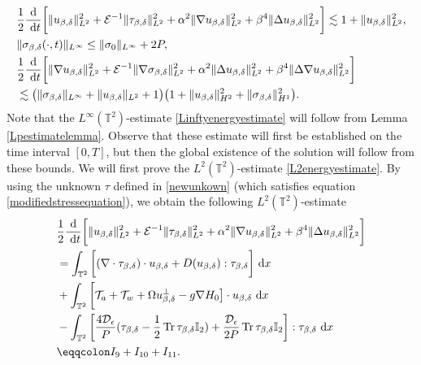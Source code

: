 \documentclass[12pt,a4paper]{article}
\theoremstyle{definition}
\theoremstyle{remark}
\numberwithin{equation}{section}
\newcommand{\dx}{\ {\rm d} {x}}
\newcommand{\dt}{\ {\rm d} t }
\DeclareMathOperator{\Tr}{Tr}
\begin{document}
\begin{align}
&\frac{1}{2} \frac{\textrm{d}}{\dt} \bigg[ \lVert u_{\beta,\delta} \rVert_{L^2}^2 + \mathcal{E}^{-1} \lVert \tau_{\beta,\delta} \rVert_{L^2}^2 + \alpha^2 \lVert \nabla u_{\beta,\delta} \rVert_{L^2}^2 + \beta^4 \lVert \Delta u_{\beta,\delta} \rVert_{L^2}^2 \bigg] \lesssim 1 + \lVert u_{\beta,\delta} \rVert_{L^2}^2, \label{L2energyestimate} \\
&\lVert \sigma_{\beta,\delta} (\cdot, t) \rVert_{L^\infty} \leq \lVert \sigma_0 \rVert_{L^\infty} + 2 P, \label{Linftyenergyestimate} \\
&\frac{1}{2} \frac{\textrm{d}}{\dt} \bigg[ \lVert \nabla u_{\beta,\delta} \rVert_{L^2}^2 + \mathcal{E}^{-1} \lVert \nabla \sigma_{\beta,\delta} \rVert_{L^2}^2 + \alpha^2 \lVert \Delta u_{\beta,\delta} \rVert_{L^2}^2 + \beta^4 \lVert \Delta \nabla u_{\beta,\delta} \rVert_{L^2}^2 \bigg] \nonumber \\
&\lesssim \big(\lVert \sigma_{\beta,\delta} \rVert_{L^\infty} + \lVert u_{\beta,\delta} \rVert_{L^2} + 1\big) \big(1 + \lVert u_{\beta,\delta} \rVert_{H^2}^2 + \lVert \sigma_{\beta,\delta} \rVert_{H^1}^2 \big). \label{H1energyestimate}
\end{align}
Note that the $L^\infty (\mathbb{T}^2)$-estimate \eqref{Linftyenergyestimate} will follow from Lemma \ref{Lpestimatelemma}. Observe that these estimate will first be established on the time interval $[0,T]$, but then the global existence of the solution will follow from these bounds. We will first prove the $L^2 (\mathbb{T}^2)$-estimate \eqref{L2energyestimate}. By using the unknown $\tau$ defined in \eqref{newunkown} (which satisfies equation \eqref{modifiedstressequation}), we obtain the following $L^2 (\mathbb{T}^2)$-estimate
\begin{align*}
&\frac{1}{2} \frac{\textrm{d}}{\dt} \bigg[ \lVert u_{\beta,\delta} \rVert_{L^2}^2 + \mathcal{E}^{-1} \lVert \tau_{\beta,\delta} \rVert_{L^2}^2 + \alpha^2 \lVert \nabla u_{\beta,\delta} \rVert_{L^2}^2 + \beta^4 \lVert \Delta u_{\beta,\delta} \rVert_{L^2}^2 \bigg] \\
&= \int_{\mathbb{T}^2} \bigg[ (\nabla \cdot \tau_{\beta,\delta}) \cdot u_{\beta,\delta} + D(u_{\beta,\delta}) : \tau_{\beta,\delta} \bigg] \dx \\
&+ \int_{\mathbb{T}^2} \bigg[ \mathcal{T}_a + \mathcal{T}_w + \Omega u^\perp_{\beta,\delta} - g \nabla H_0 \big] \cdot u_{\beta,\delta} \dx \\
&- \int_{\mathbb{T}^2} \bigg[ \frac{4 \mathcal{D}_\epsilon}{P} (\tau_{\beta,\delta} - \frac{1}{2} \Tr \tau_{\beta,\delta} \mathbb I_2) + \frac{\mathcal{D}_\epsilon}{2 P} \Tr \tau_{\beta,\delta} \mathbb I_2 \bigg] : \tau_{\beta,\delta} \dx \\
&\eqqcolon I_9 + I_{10} + I_{11}.
\end{align*}
\end{document}
